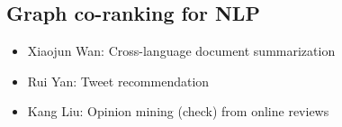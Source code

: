   \subsection{Graph co-ranking for NLP}
  \label{subsec:graph_co_ranking_for_nlp}
    \begin{itemize}
      \item{Xiaojun Wan: Cross-language document summarization}
      \item{Rui Yan: Tweet recommendation}
      \item{Kang Liu: Opinion mining (check) from online reviews}
    \end{itemize}

